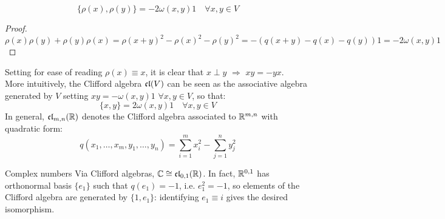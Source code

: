 
\begin{lemma}[before upper = {\tcbtitle}]{}{}
  \begin{equation*}
    \{\rho(x) , \rho(y)\} = - 2 \omega(x,y) \mathit{1} \quad \forall x,y \in V
  \end{equation*}
\end{lemma}

\begin{proofbox}
  \begin{proof}
    \begin{equation*}
      \rho(x) \rho(y) + \rho(y) \rho(x) = \rho(x + y)^2 - \rho(x)^2 - \rho(y)^2 = - \left( q(x + y) - q(x) - q(y) \right) \mathit{1} = - 2 \omega(x,y) \mathit{1}
    \end{equation*}
  \end{proof}
\end{proofbox}

Setting for ease of reading $ \rho(x) \equiv x $, it is clear that $ x \perp y \,\,\Rightarrow\,\, xy = -yx $.\\
More intuitively, the Clifford algebra $ \mathfrak{cl}(V) $ can be seen as the associative algebra generated by $ V $ setting $ xy = - \omega(x,y)\mathit{1} \,\,\forall x,y \in V$, so that:
\begin{equation}
  \{x,y\} = 2 \omega(x,y)\mathit{1} \quad \forall x,y \in V
  \label{eq:cliff-alg}
\end{equation}
In general, $ \mathfrak{cl}_{m,n}(\mathbb{R}) $ denotes the Clifford algebra associated to $ \mathbb{R}^{m,n} $ with quadratic form:
\begin{equation*}
  q(x_1,\dots,x_m,y_1,\dots,y_n) = \sum_{i = 1}^{m} x_i^2 - \sum_{j = 1}^{n} y_j^2
\end{equation*}

\begin{example}{Complex numbers}{}
  Via Clifford algebras, $ \mathbb{C} \cong \mathfrak{cl}_{0,1}(\mathbb{R}) $. In fact, $ \mathbb{R}^{0,1} $ has orthonormal basis $ \{e_1\} $ such that $ q(e_1) = -1 $, i.e. $ e_1^2 = - \mathit{1} $, so elements of the Clifford algebra are generated by $ \{\mathit{1},e_1\} $: identifying $ e_1 \equiv i $ gives the desired isomorphism.
\end{example}

